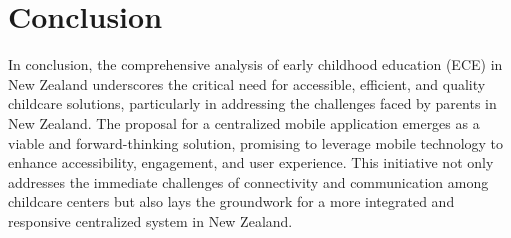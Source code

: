 \section{Conclusion}

In conclusion, the comprehensive analysis of early childhood education (ECE) in New Zealand underscores the critical need for accessible, efficient, and quality childcare solutions, particularly in addressing the challenges faced by parents in New Zealand. The proposal for a centralized mobile application emerges as a viable and forward-thinking solution, promising to leverage mobile technology to enhance accessibility, engagement, and user experience. This initiative not only addresses the immediate challenges of connectivity and communication among childcare centers but also lays the groundwork for a more integrated and responsive centralized system in New Zealand. 